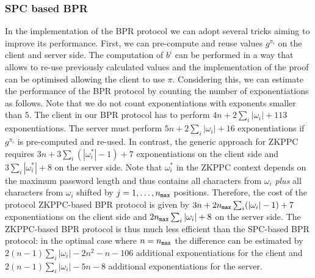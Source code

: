\subsubsection{SPC based BPR}
In the implementation of the \ac{BPR} protocol we can adopt several tricks aiming to improve its performance. First, we can pre-compute and reuse values $g^{\pi_i}$ on the client and server side.
The computation of $b^i$ can be performed in a way that allows to re-use previously calculated values and the implementation of the proof can be optimised allowing the client to use $\pi$.
Considering this, we can estimate the performance of the \ac{BPR} protocol by counting the number of exponentiations as follows.
Note that we do not count exponentiations with exponents smaller than $5$.
%
The client in our BPR protocol has to perform $4n+2\sum_i |\omega_i| + 113$ exponentiations.
The server must perform $5n + 2\sum_i |\omega_i| + 16$ exponentiations if $g^{\pi_i}$ is pre-computed and re-used.
In contrast, the generic approach for \ac{ZKPPC} requires $3n+3\sum_i (|\omega^\ast_i|-1)+7$ exponentiations on the client side and $3\sum_i |\omega^\ast_i|+8$ on the server side.
Note that $\omega^\ast_i$ in the \ac{ZKPPC} context depends on the maximum password length and thus contains all characters from $\omega_i$ \emph{plus} all characters from $\omega_i$ shifted by $j = 1,\ldots, {n_\mathtt{max}}$ positions.
Therefore, the cost of the protocol \ac{ZKPPC}-based \ac{BPR} protocol is given by $3n+2{n_\mathtt{max}}\sum_i (|\omega_i|-1)+7$ exponentiations on the client side and $2{n_\mathtt{max}}\sum_i |\omega_i|+8$ on the server side. 
The \ac{ZKPPC}-based \ac{BPR} protocol is thus much less efficient than the \ac{SPC}-based \ac{BPR} protocol: in the optimal case where $n={n_\mathtt{max}}$ the difference can be estimated by  $2(n-1)\sum_i|\omega_i| - 2n^2 - n - 106$ additional exponentiations for the client and $2(n-1)\sum_i|\omega_i| - 5n - 8$ additional exponentiations for the server.

